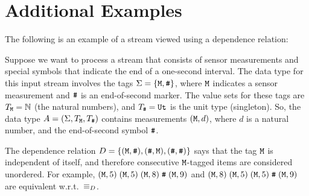 \section{Additional Examples}


The following is an example of a stream viewed using a dependence relation:

\begin{example}
\label{45:ex:dependence}
Suppose we want to process a stream that consists of sensor measurements and special symbols that indicate the end of a one-second interval. The data type for this input stream involves the tags $\Sigma = \{ \texttt{M}, \texttt{\#} \}$, where $\texttt{M}$ indicates a sensor measurement and $\texttt{\#}$ is an end-of-second marker. The value sets for these tags are $T_{\texttt{M}} = \mathbb{N}$ (the natural numbers), and $T_{\texttt{\#}} = \mathtt{Ut}$ is the unit type (singleton). So, the data type $A = (\Sigma,T_{\texttt{M}},T_{\texttt{\#}})$ contains measurements $(\texttt{M}, d)$, where $d$ is a natural number, and the end-of-second symbol $\texttt{\#}$.

The dependence relation $D = \{ (\texttt{M}, \texttt{\#}), (\texttt{\#}, \texttt{M}), (\texttt{\#},\texttt{\#}) \}$ says that the tag $\texttt{M}$ is independent of itself, and therefore consecutive $\texttt{M}$-tagged items are considered unordered. For example, $(\texttt{M}, 5) \; (\texttt{M}, 5) \; (\texttt{M}, 8) \; \texttt{\#} \; (\texttt{M}, 9)$ and $(\texttt{M}, 8) \; (\texttt{M}, 5) \; (\texttt{M}, 5) \; \texttt{\#} \; (\texttt{M}, 9)$ are equivalent w.r.t.\ $\equiv_D$.
\end{example}

